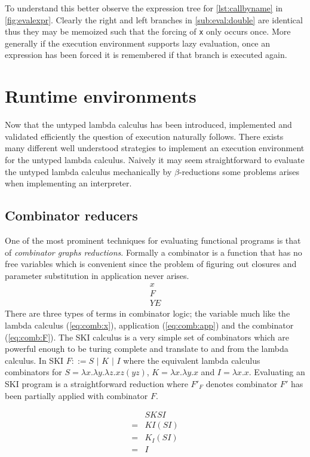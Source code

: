 \documentclass[11pt,oneside,a4paper]{report}
\begin{document}
To understand this better observe the expression tree for \autoref{lst:callbyname} in \autoref{fig:evalexpr}.
Clearly the right and left branches in \autoref{sub:eval:double} are identical thus they may be memoized such that the forcing of \texttt{x} only occurs once.
More generally if the execution environment supports lazy evaluation, once an expression has been forced it is remembered if that branch is executed again.

\section{Runtime environments}
Now that the untyped lambda calculus has been introduced, implemented and validated efficiently the question of execution naturally follows.
There exists many different well understood strategies to implement an execution environment for the untyped lambda calculus.
Naively it may seem straightforward to evaluate the untyped lambda calculus mechanically by $\beta$-reductions some problems arises when implementing an interpreter.

\subsection{Combinator reducers}
One of the most prominent techniques for evaluating functional programs is that of \textit{combinator graphs reductions}.
Formally a combinator is a function that has no free variables which is convenient since the problem of figuring out closures and parameter substitution in application never arises.
\begin{align}
    x \label{eq:comb:x}\\
    F \label{eq:comb:F}\\
    Y E \label{eq:comb:app}
\end{align}
There are three types of terms in combinator logic; the variable much like the lambda calculus (\autoref{eq:comb:x}), application (\autoref{eq:comb:app}) and the combinator (\autoref{eq:comb:F}).
The SKI calculus is a very simple set of combinators which are powerful enough to be turing complete and translate to and from the lambda calculus.
In SKI $F ::= S \,\,|\,\, K \,\,|\,\, I$ where the equivalent lambda calculus combinators for $S = \lambda x . \lambda y . \lambda z . x z (y z)$, $K = \lambda x . \lambda y . x$ and $I = \lambda x . x$.
Evaluating an SKI program is a straightforward reduction where $F'_F$ denotes combinator $F'$ has been partially applied with combinator $F$.
\begin{exmp}
    \begin{align}
        &SKSI\\
        = &KI(SI)\tag*{}\\
        = &K_I(SI)\tag*{}\\
        = &I\tag*{}
    \end{align}
\end{exmp}
\end{document}
